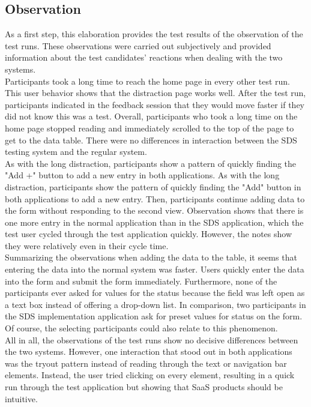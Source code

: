 \subsection{Observation}
As a first step, this elaboration provides the test results of the observation of the test runs. These observations were carried out subjectively and provided information about the test candidates' reactions when dealing with the two systems.\\
Participants took a long time to reach the home page in every other test run. This user behavior shows that the distraction page works well. After the test run, participants indicated in the feedback session that they would move faster if they did not know this was a test. Overall, participants who took a long time on the home page stopped reading and immediately scrolled to the top of the page to get to the data table. There were no differences in interaction between the SDS testing system and the regular system. \\
As with the long distraction, participants show a pattern of quickly finding the "Add +" button to add a new entry in both applications. As with the long distraction, participants show the pattern of quickly finding the "Add" button in both applications to add a new entry. Then, participants continue adding data to the form without responding to the second view. Observation shows that there is one more entry in the normal application than in the \ac{SDS} application, which the test user cycled through the test application quickly. However, the notes show they were relatively even in their cycle time.  \\
Summarizing the observations when adding the data to the table, it seems that entering the data into the normal system was faster. Users quickly enter the data into the form and submit the form immediately. Furthermore, none of the participants ever asked for values for the status because the field was left open as a text box instead of offering a drop-down list. In comparison, two participants in the \ac{SDS} implementation application ask for preset values for status on the form. Of course, the selecting participants could also relate to this phenomenon.  \\
All in all, the observations of the test runs show no decisive differences between the two systems. However, one interaction that stood out in both applications was the tryout pattern instead of reading through the text or navigation bar elements. Instead, the user tried clicking on every element, resulting in a quick run through the test application but showing that \ac{SaaS} products should be intuitive. 

